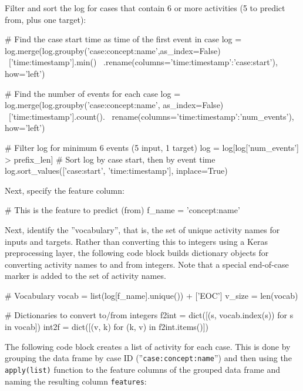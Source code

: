 Filter and sort the log for cases that contain 6 or more activities (5 to predict from, plus one target):

\begin{samepage}
\begin{pythoncode}
# Find the case start time as time of the first event in case
log = log.merge(log.groupby('case:concept:name',as_index=False) \
    ['time:timestamp'].min() \
    .rename(columns={'time:timestamp':'case:start'}), how='left')
    
# Find the number of events for each case
log = log.merge(log.groupby('case:concept:name', as_index=False) \
    ['time:timestamp'].count(). \
    rename(columns={'time:timestamp':'num_events'}), how='left')
    
# Filter log for minimum 6 events (5 input, 1 target)
log = log[log['num_events'] > prefix_len]
# Sort log by case start, then by event time
log.sort_values(['case:start', 'time:timestamp'], inplace=True)
\end{pythoncode}
\end{samepage}

Next, specify the feature column:

\begin{pythoncode}
# This is the feature to predict (from)
f_name = 'concept:name'
\end{pythoncode}

Next, identify the ''vocabulary'', that is, the set of unique activity names for inputs and targets. Rather than converting this to integers using a Keras preprocessing layer, the following code block builds dictionary objects for converting activity names to and from integers. Note that a special end-of-case marker is added to the set of activity names.

\begin{samepage}
\begin{pythoncode}
# Vocabulary
vocab = list(log[f_name].unique()) + ['EOC']
v_size = len(vocab)

# Dictionaries to convert to/from integers
f2int = dict([(s, vocab.index(s)) for s in vocab])
int2f = dict([(v, k) for (k, v) in f2int.items()])
\end{pythoncode}
\end{samepage}

The following code block creates a list of activity for each case. This is done by grouping the data frame by case ID (''\texttt{case:concept:name}'') and then using the \texttt{apply(list)} function to the feature columns of the grouped data frame and naming the resulting column \texttt{features}:

